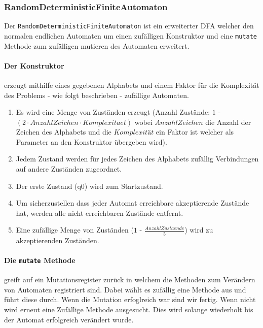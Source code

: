 \subsubsection{RandomDeterministicFiniteAutomaton}
Der \lstinline$RandomDeterministicFiniteAutomaton$ ist ein erweiterter DFA welcher den normalen endlichen Automaten um einen zufälligen Konstruktor und eine \lstinline$mutate$ Methode zum zufälligen mutieren des Automaten erweitert.

\paragraph{Der Konstruktor} erzeugt mithilfe eines gegebenen Alphabets und einem Faktor für die Komplexität des Problems - wie folgt beschrieben - zufällige Automaten.
\begin{enumerate}
  \item Es wird eine Menge von Zuständen erzeugt (Anzahl Zustände: $1$ - $(2 \cdot AnzahlZeichen \cdot Komplexitaet)$ wobei $AnzahlZeichen$ die Anzahl der Zeichen des Alphabets und die $Komplexität$ ein Faktor ist welcher als Parameter an den Konstruktor übergeben wird).
  \item Jedem Zustand werden für jedes Zeichen des Alphabets zufällig Verbindungen auf andere Zuständen zugeordnet.
  \item Der erste Zustand (q0) wird zum Startzustand.
  \item Um sicherzustellen dass jeder Automat erreichbare akzeptierende Zustände hat, werden alle nicht erreichbaren Zustände entfernt.
  \item Eine zufällige Menge von Zuständen ($1$ - $\frac{AnzahlZustaende}{5}$) wird zu akzeptierenden Zuständen.
\end{enumerate}


\paragraph{Die \lstinline$mutate$ Methode} greift auf ein Mutationsregister zurück in welchem die Methoden zum Verändern von Automaten registriert sind. Dabei wählt es zufällig eine Methode aus und führt diese durch. Wenn die Mutation erfoglreich war sind wir fertig. Wenn nicht wird erneut eine Zufällige Methode ausgesucht. Dies wird solange wiederholt bis der Automat erfolgreich verändert wurde.

